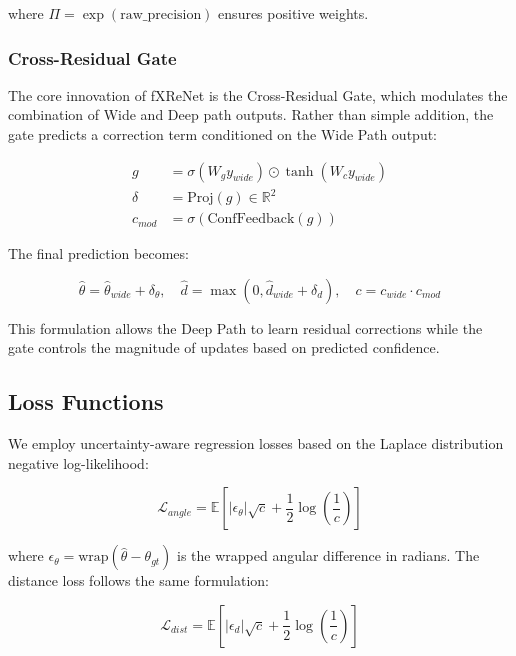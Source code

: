 \documentclass[sigconf,nonacm]{acmart}
\begin{document}
where $\Pi = \exp(\text{raw\_precision})$ ensures positive weights.

\subsubsection{Cross-Residual Gate}

The core innovation of fXReNet is the Cross-Residual Gate, which modulates the combination of Wide and Deep path outputs. Rather than simple addition, the gate predicts a correction term conditioned on the Wide Path output:

\begin{align}
g &= \sigma(W_g y_{wide}) \odot \tanh(W_c y_{wide}) \\
\delta &= \text{Proj}(g) \in \mathbb{R}^2 \\
c_{mod} &= \sigma(\text{ConfFeedback}(g))
\end{align}

The final prediction becomes:

\begin{equation}
\hat{\theta} = \hat{\theta}_{wide} + \delta_\theta, \quad
\hat{d} = \max(0, \hat{d}_{wide} + \delta_d), \quad
c = c_{wide} \cdot c_{mod}
\end{equation}

This formulation allows the Deep Path to learn residual corrections while the gate controls the magnitude of updates based on predicted confidence.

\subsection{Loss Functions}

We employ uncertainty-aware regression losses based on the Laplace distribution negative log-likelihood:

\begin{equation}
\mathcal{L}_{angle} = \mathbb{E}\left[|\epsilon_\theta| \sqrt{c} + \frac{1}{2} \log\left(\frac{1}{c}\right)\right]
\end{equation}

where $\epsilon_\theta = \text{wrap}(\hat{\theta} - \theta_{gt})$ is the wrapped angular difference in radians. The distance loss follows the same formulation:

\begin{equation}
\mathcal{L}_{dist} = \mathbb{E}\left[|\epsilon_d| \sqrt{c} + \frac{1}{2} \log\left(\frac{1}{c}\right)\right]
\end{equation}
\end{document}
